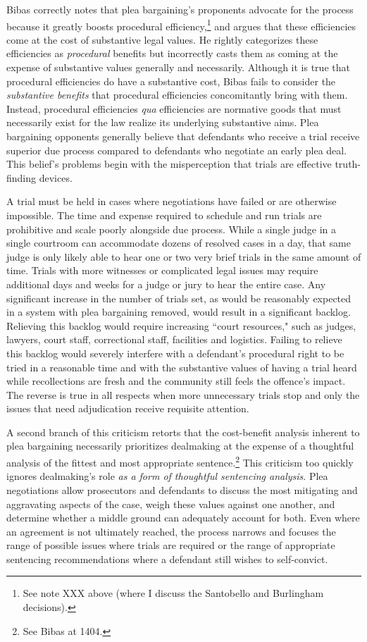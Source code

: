 Bibas correctly notes that plea bargaining's proponents advocate for the process because it greatly boosts procedural efficiency,\footnote{See note XXX above (where I discuss the Santobello and Burlingham decisions).} and argues that these efficiencies come at the cost of substantive legal values. He rightly categorizes these efficiencies as \textit{procedural} benefits but incorrectly casts them as coming at the expense of substantive values generally and necessarily. Although it is true that procedural efficiencies do have a substantive cost, Bibas fails to consider the \textit{substantive benefits} that procedural efficiencies concomitantly bring with them. Instead, procedural efficiencies \textit{qua} efficiencies are normative goods that must necessarily exist for the law realize its underlying substantive aims. Plea bargaining opponents generally believe that defendants who receive a trial receive superior due process compared to defendants who negotiate an early plea deal. This belief's problems begin with the misperception that trials are effective truth-finding devices.

A trial must be held in cases where negotiations have failed or are otherwise impossible. The time and expense required to schedule and run trials are prohibitive and scale poorly alongside due process. While a single judge in a single courtroom can accommodate dozens of resolved cases in a day, that same judge is only likely able to hear one or two very brief trials in the same amount of time. Trials with more witnesses or complicated legal issues may require additional days and weeks for a judge or jury to hear the entire case. Any significant increase in the number of trials set, as would be reasonably expected in a system with plea bargaining removed, would result in a significant backlog. Relieving this backlog would require increasing ``court resources," such as judges, lawyers, court staff, correctional staff, facilities and logistics. Failing to relieve this backlog would severely interfere with a defendant's procedural right to be tried in a reasonable time and with the substantive values of having a trial heard while recollections are fresh and the community still feels the offence's impact. The reverse is true in all respects when more unnecessary trials stop and only the issues that need adjudication receive requisite attention.

A second branch of this criticism retorts that the cost-benefit analysis inherent to plea bargaining necessarily prioritizes dealmaking at the expense of a thoughtful analysis of the fittest and most appropriate sentence.\footnote{See Bibas at 1404.} This criticism too quickly ignores dealmaking's role \textit{as a form of thoughtful sentencing analysis}. Plea negotiations allow prosecutors and defendants to discuss the most mitigating and aggravating aspects of the case, weigh these values against one another, and determine whether a middle ground can adequately account for both. Even where an agreement is not ultimately reached, the process narrows and focuses the range of possible issues where trials are required or the range of appropriate sentencing recommendations where a defendant still wishes to self-convict.

